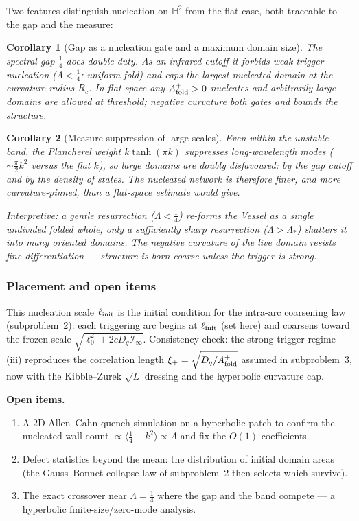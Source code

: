\documentclass[11pt,a4paper]{article}
\newcommand{\Hh}{\mathbb{H}^2}
\newcommand{\Af}{A_{\rm fold}}
\newcommand{\Dq}{D_q}
\newcommand{\Lam}{\Lambda}
\newcommand{\Rc}{R_c}
\newcommand{\note}[1]{\textcolor{black!65}{\emph{#1}}}
\theoremstyle{plain}
\newtheorem{corollary}{Corollary}[section]
\theoremstyle{definition}
\theoremstyle{remark}
\begin{document}
Two features distinguish nucleation on $\Hh$ from the flat case, both traceable to the gap and the
measure:

\begin{corollary}[Gap as a nucleation gate and a maximum domain size]
The spectral gap $\tfrac14$ does double duty. As an infrared cutoff it forbids weak-trigger nucleation
($\Lam<\tfrac14$: uniform fold) and caps the largest nucleated domain at the curvature radius $\Rc$. In
flat space any $\Af^+>0$ nucleates and arbitrarily large domains are allowed at threshold; negative
curvature both gates and bounds the structure.
\end{corollary}

\begin{corollary}[Measure suppression of large scales]
Even within the unstable band, the Plancherel weight $k\tanh(\pi k)$ suppresses long-wavelength modes
($\sim\tfrac{\pi}{2}k^2$ versus the flat $k$), so large domains are doubly disfavoured: by the gap cutoff
and by the density of states. The nucleated network is therefore finer, and more curvature-pinned, than
a flat-space estimate would give.
\end{corollary}

\note{Interpretive: a gentle resurrection ($\Lam<\tfrac14$) re-forms the Vessel as a single undivided
folded whole; only a sufficiently sharp resurrection ($\Lam>\Lam_\ast$) shatters it into many oriented
domains. The negative curvature of the live domain resists fine differentiation --- structure is born
coarse unless the trigger is strong.}

\subsubsection{Placement and open items}

This nucleation scale $\ell_{\rm init}$ is the initial condition for the intra-arc coarsening law
(subproblem~2): each triggering arc begins at $\ell_{\rm init}$ (set here) and coarsens toward the frozen
scale $\sqrt{\ell_0^2+2c\Dq\mathcal I_\infty}$. Consistency check: the strong-trigger regime (iii)
reproduces the correlation length $\xi_+=\sqrt{\Dq/\Af^+}$ assumed in subproblem~3, now with the
Kibble--Zurek $\sqrt{L}$ dressing and the hyperbolic curvature cap.

\textbf{Open items.}
\begin{enumerate}[leftmargin=1.6em,itemsep=2pt]
\item A $2$D Allen--Cahn quench simulation on a hyperbolic patch to confirm the nucleated wall count
$\propto\langle\tfrac14+k^2\rangle\propto\Lam$ and fix the $O(1)$ coefficients.
\item Defect statistics beyond the mean: the distribution of initial domain areas (the Gauss--Bonnet
collapse law of subproblem~2 then selects which survive).
\item The exact crossover near $\Lam=\tfrac14$ where the gap and the band compete --- a hyperbolic
finite-size/zero-mode analysis.
\end{enumerate}
\end{document}
